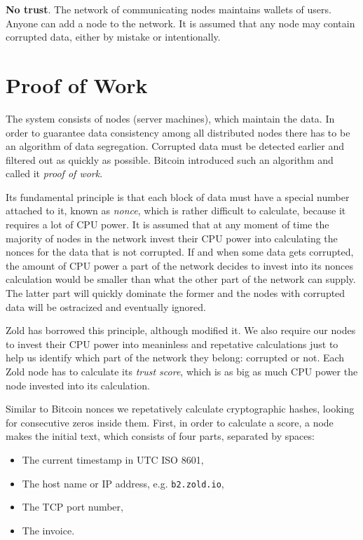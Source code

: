 \documentclass[11pt,oneside]{article}
\newcommand\dd[1]{\colorbox{gray!30}{\texttt{#1}}}
\begin{document}
\textbf{No trust}.
The network of communicating nodes maintains wallets of users.
Anyone can add a node to the network.
It is assumed that any node may contain corrupted data, either by mistake or intentionally.

\section{Proof of Work}

The system consists of nodes (server machines), which maintain the data.
In order to guarantee data consistency among all distributed nodes
there has to be an algorithm of data segregation.
Corrupted data must be detected earlier and filtered out as quickly as possible.
Bitcoin introduced such an algorithm and called it \emph{proof of work}.

Its fundamental principle is that each block of data must have a special
number attached to it, known as \emph{nonce}, which is rather difficult to calculate,
because it requires a lot of CPU power. It is assumed that at any moment
of time the majority of nodes in the network invest their CPU power into
calculating the nonces for the data that is not corrupted. If and when
some data gets corrupted, the amount of CPU power a part of the network
decides to invest into its nonces calculation would be smaller than what
the other part of the network can supply. The latter part
will quickly dominate the former and the nodes with corrupted data will
be ostracized and eventually ignored.

Zold has borrowed this principle, although modified it. We also require
our nodes to invest their CPU power into meaninless and repetative
calculations just to help us identify which part of the network they belong:
corrupted or not. Each Zold node has to calculate its \emph{trust score},
which is as big as much CPU power the node invested into its calculation.

Similar to Bitcoin nonces we repetatively calculate cryptographic hashes,
looking for consecutive zeros inside them. First, in order to calculate a score,
a node makes the initial text, which consists of four parts,
separated by spaces:

\begin{itemize}
\item The current timestamp in UTC ISO 8601,
\item The host name or IP address, e.g. \dd{b2.zold.io},
\item The TCP port number,
\item The invoice.
\end{itemize}
\end{document}
